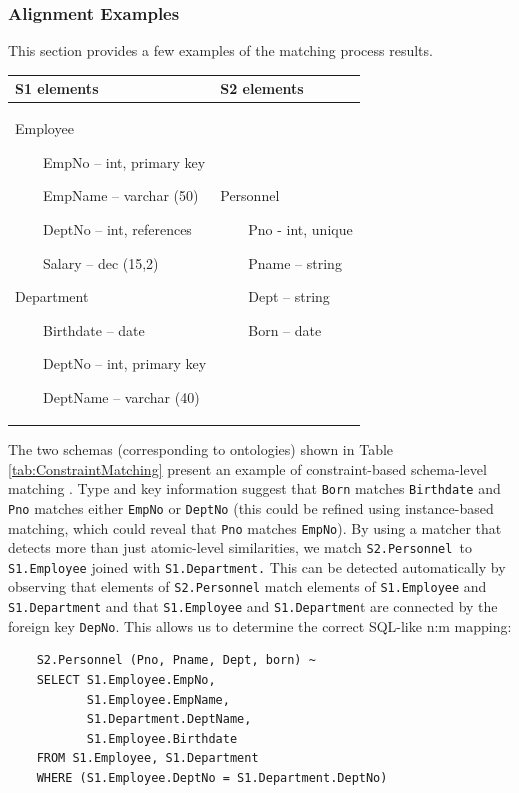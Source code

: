 \subsubsection{Alignment Examples}
This section provides a few examples of the matching
process{\textquotesingle} results.
\begin{center}
\label{tab:ConstraintMatching}
\tablehead{}
\begin{supertabular}{|m{0.4\textwidth}|m{0.4\textwidth}|}
\hline
S1 elements &
S2 elements\\\hline
Employee

\ \ \ \ EmpNo -- int, primary key

\ \ \ \ EmpName -- varchar (50)

\ \ \ \ DeptNo -- int, references 

\ \ \ \ Salary -- dec (15,2)

Department

\ \ \ \ Birthdate -- date

\ \ \ \ DeptNo -- int, primary key

\ \ \ \ DeptName -- varchar (40) &
Personnel

\ \ \ \ Pno - int, unique

\ \ \ \ Pname -- string

\ \ \ \ Dept -- string

\ \ \ \ Born -- date\\\hline
\end{supertabular}
\end{center}
The two schemas (corresponding to ontologies) shown in Table \ref{tab:ConstraintMatching} present
an example of constraint-based schema-level matching \cite{rahm01survey}. Type and key information suggest that
\texttt{Born} matches \texttt{Birthdate} and
\texttt{Pno} matches either \texttt{EmpNo} or
\texttt{DeptNo} (this could be refined using
instance-based matching, which could reveal that
\texttt{Pno} matches \texttt{EmpNo}). By
using a matcher that detects more than just atomic-level similarities,
we match \texttt{S2.Personnel }to
\texttt{S1.Employee} joined with
\texttt{S1.Department.} This can be detected automatically
by observing that elements of \texttt{S2.Personnel} match
elements of \texttt{S1.Employee} and
\texttt{S1.Department} and that
\texttt{S1.Employee} and
\texttt{S1.Departmen}t are connected by the foreign key
\texttt{DepNo}. This allows us to determine the correct
SQL-like n:m mapping:
\begin{verbatim}
    S2.Personnel (Pno, Pname, Dept, born) ~
    SELECT S1.Employee.EmpNo,
           S1.Employee.EmpName,
           S1.Department.DeptName,
           S1.Employee.Birthdate
    FROM S1.Employee, S1.Department
    WHERE (S1.Employee.DeptNo = S1.Department.DeptNo)
\end{verbatim}


